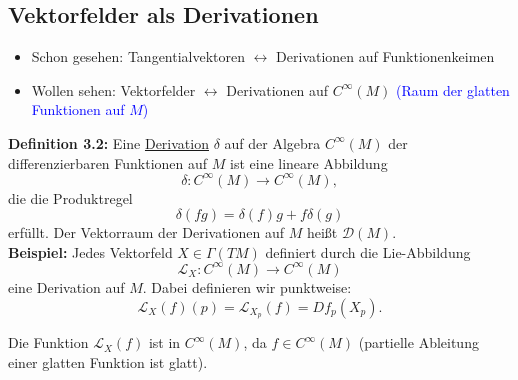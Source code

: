 \documentclass[fleqn, 12pt, letterpaper]{article}
\begin{document}
\subsection{Vektorfelder als Derivationen}

\begin{itemize}
  \item Schon gesehen: Tangentialvektoren \( \longleftrightarrow \) Derivationen auf Funktionenkeimen
  \item Wollen sehen: Vektorfelder \( \longleftrightarrow \) Derivationen auf \( C^\infty(M) \) \textcolor{blue}{(Raum der glatten Funktionen auf \( M \))}
\end{itemize}

\textbf{Definition 3.2:}
Eine \underline{Derivation} \( \delta \) auf der Algebra \( C^\infty(M) \) der differenzierbaren Funktionen auf \( M \) ist eine lineare Abbildung
\[
\delta \colon C^\infty(M) \longrightarrow C^\infty(M),
\]
die die Produktregel
\[
\delta(fg) = \delta(f)g + f\delta(g)
\]
erfüllt. Der Vektorraum der Derivationen auf \( M \) heißt \( \mathcal{D}(M) \).\\

\textbf{Beispiel:}
Jedes Vektorfeld \( X \in \Gamma(TM) \) definiert durch die Lie-Abbildung
\[
\mathcal{L}_X \colon C^\infty(M) \to C^\infty(M)
\]
eine Derivation auf \( M \). Dabei definieren wir punktweise:
\[
\mathcal{L}_X(f)(p) = \mathcal{L}_{X_p}(f) = Df_p(X_p).
\]

Die Funktion \( \mathcal{L}_X(f) \) ist in \( C^\infty(M) \), da \( f \in C^\infty(M) \)
(partielle Ableitung einer glatten Funktion ist glatt).

\vspace{1em}
\end{document}
